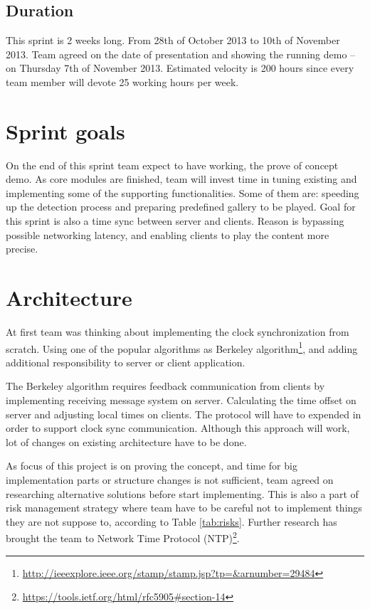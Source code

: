 

\subsection{Duration}
This sprint is 2 weeks long. From 28th of October 2013 to 10th of November 2013. 
Team agreed on the date of presentation and showing the running demo – on Thursday 7th of November 2013.
Estimated velocity is 200 hours since every team member will devote 25 working hours per week.


\section{Sprint goals}

On the end of this sprint team expect to have working, the prove of concept demo. As core modules are finished, team will invest time in tuning existing and implementing some of the supporting functionalities. Some of them are: speeding up the detection process  and preparing predefined gallery to be played. Goal for this sprint is also a time sync between server and clients. Reason is bypassing possible networking latency, and enabling clients to play the content more precise. 

\section{Architecture}

At first team was thinking about implementing the clock synchronization from scratch. Using one of the popular algorithms as Berkeley algorithm\footnote{\url{http://ieeexplore.ieee.org/stamp/stamp.jsp?tp=\&arnumber=29484}}, and adding additional responsibility to server or client application. 

The Berkeley algorithm requires feedback communication from clients by implementing receiving message system on server. Calculating the time offset on server and adjusting local times on clients. The protocol will have to expended in order to support clock sync communication. Although this approach will work, lot of changes on existing architecture have to be done.

As focus of this project is on proving the concept, and time for big implementation parts or structure changes is not sufficient, team agreed on researching alternative solutions before start implementing. This is also a part of risk management strategy where team have to be careful not to implement things they are not suppose to, according to Table \ref{tab:risks}. Further research has brought the team to Network Time Protocol (NTP)\footnote{\url{https://tools.ietf.org/html/rfc5905\#section-14}}.

